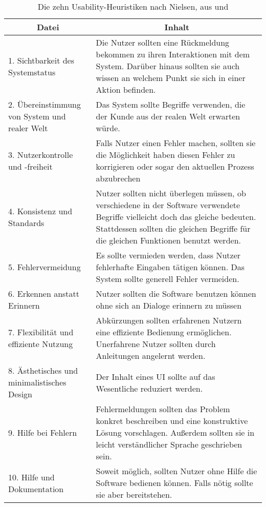 \documentclass[11pt,a4paper]{report}
\begin{document}
\begin{table}[htpb]
\caption{Die zehn Usability-Heuristiken nach Nielsen, aus \cite{nielsend} und \cite{nielsen}}
\begin{center}
\begin{tabular}{|p{}|p{}|}
    \hline
    \multicolumn{1}{|c|}{\textbf{Datei}} & 
	\multicolumn{1}{|c|}{\textbf{Inhalt}} \\
    \hline
    1. Sichtbarkeit des Systemstatus & Die Nutzer sollten eine Rückmeldung bekommen zu ihren Interaktionen mit dem System. Darüber hinaus sollten sie auch wissen an welchem Punkt sie sich in einer Aktion befinden.\\
	\hline
  2. Übereinstimmung von System und realer Welt & Das System sollte Begriffe verwenden, die der Kunde aus der realen Welt erwarten würde.\\
    \hline
   3.  Nutzerkontrolle und -freiheit & Falls Nutzer einen Fehler machen, sollten sie die Möglichkeit haben diesen Fehler zu korrigieren oder sogar den aktuellen Prozess abzubrechen	\\
    \hline
    4. Konsistenz und Standards & Nutzer sollten nicht überlegen müssen, ob verschiedene in der Software verwendete Begriffe vielleicht doch das gleiche bedeuten. Stattdessen sollten die gleichen Begriffe für die gleichen Funktionen benutzt werden.\\
    \hline
   5. Fehlervermeidung & Es sollte vermieden werden, dass Nutzer fehlerhafte Eingaben tätigen können. Das System sollte generell Fehler vermeiden. \\
   \hline
   6. Erkennen anstatt Erinnern & Nutzer sollten die Software benutzen können ohne sich an Dialoge erinnern zu müssen \\
    \hline
  7. Flexibilität und effiziente Nutzung & Abkürzungen sollten erfahrenen Nutzern eine effiziente Bedienung ermöglichen. Unerfahrene Nutzer sollten durch Anleitungen angelernt werden. \\
    \hline
   8. Ästhetisches und minimalistisches Design & Der Inhalt eines UI sollte auf das Wesentliche reduziert werden. \\
    \hline
   9. Hilfe bei Fehlern & Fehlermeldungen sollten das Problem konkret beschreiben und eine konstruktive Lösung vorschlagen. Außerdem sollten sie in leicht verständlicher Sprache geschrieben sein. \\
    \hline
    10. Hilfe und Dokumentation & Soweit möglich, sollten Nutzer ohne Hilfe die Software bedienen können. Falls nötig sollte sie aber bereitstehen.\\
   
    \hline
\end{tabular}
\end{center}
\label{t:ui}
\end{table}
\end{document}
